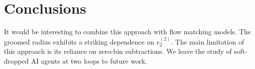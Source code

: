 \section{Conclusions}\label{sec:conclusions}

It would be interesting to combine this approach with flow matching
models. The groomed radius exhibits a striking dependence on
$e_2^{(2)}$. The main limitation of this approach is its reliance on
zero-bin subtractions. We leave the study of soft-dropped AI agents at
two loops to future work.

